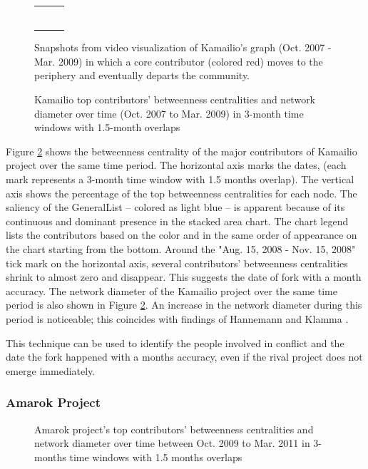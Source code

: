 \documentclass{acm_proc_article-sp}
\begin{document}
\begin{figure}[!htb]
\begin{tabularx}{\linewidth}{@{}cXX@{}}
\begin{tabular}{cccc}
\end{tabular} 
\end{tabularx} 
\caption{Snapshots from video visualization of Kamailio's graph (Oct. 2007 - Mar. 2009) in which a core contributor (colored red) moves to the periphery and eventually departs the community.} 
\label{figureKamailioGraph} 
\end{figure} 

\begin{figure}[!htb]
\centering
{}
\justifying
{}
\caption{Kamailio top contributors' betweenness centralities and network diameter over time (Oct. 2007 to Mar. 2009) in 3-month time windows with 1.5-month overlaps}
\label{figureKamailioStackedAreaChart}
\end{figure}

Figure \ref{figureKamailioStackedAreaChart} shows the betweenness centrality of the major contributors of Kamailio project over the same time period. The horizontal axis marks the dates, (each mark represents a 3-month time window with 1.5 months overlap). The vertical axis shows the percentage of the top betweenness centralities for each node. The saliency of the GeneralList -- colored as light blue -- is apparent because of its continuous and dominant presence in the stacked area chart. The chart legend lists the contributors based on the color and in the same order of appearance on the chart starting from the bottom. Around the "Aug. 15, 2008 - Nov. 15, 2008" tick mark on the horizontal axis, several contributors' betweenness centralities shrink to almost zero and disappear. This suggests the date of fork with a month accuracy. The network diameter of the Kamailio project over the same time period is also shown in Figure \ref{figureKamailioStackedAreaChart}. An increase in the network diameter during this period is noticeable; this coincides with findings of Hannemann and Klamma \cite{Hannemann}.

This technique can be used to identify the people involved in conflict and the date the fork happened with a months accuracy, even if the rival project does not emerge immediately.

\subsubsection{Amarok Project}
\begin{figure}[!Ht]
\centering
{}
\justifying
{}
\caption{Amarok project's top contributors' betweenness centralities and network diameter over time between Oct. 2009 to Mar. 2011 in 3-months time windows with 1.5 months overlaps}
\label{figureAmarokStachedAreaChart}
\end{figure}
\end{document}
